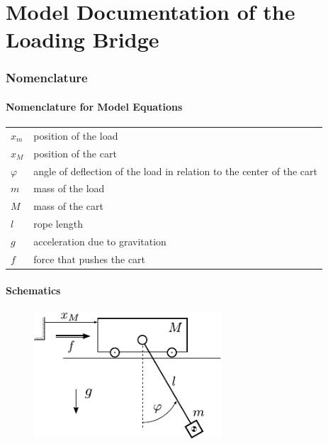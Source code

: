 \documentclass[10pt,a4paper]{article}
\begin{document}
	\part*{Model Documentation of the \\ Loading Bridge} %


	\section{Nomenclature} %
	\subsection{Nomenclature for Model Equations} %

	\begin{tabular}{ll}
		$x_m$ & position of the load \\
		$x_M$ & position of the cart \\
		$\varphi$ & angle of deflection of the load in relation to the center of the cart\\
		$m$ & mass of the load \\
		$M$ & mass of the cart \\
		$l$ & rope length \\
		$g$ & acceleration due to gravitation \\
		$f$ & force that pushes the cart \\

	\end{tabular}


	\subsection{Schematics}
	\begin{figure}[H]
		\includegraphics[width=70mm]{sketch.pdf}
	\end{figure}
\end{document}
